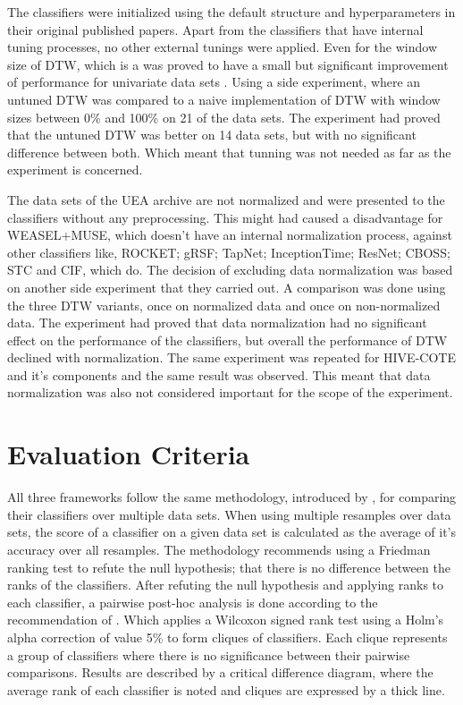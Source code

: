The classifiers were initialized using the default structure and hyperparameters in their original published papers.
Apart from the classifiers that have internal tuning processes, no other external tunings were applied.
Even for the window size of DTW, which is a was proved to have a small but significant improvement of performance for univariate data sets \cite{ratanamahatana2005three}.
Using a side experiment, where an untuned DTW was compared to a naive implementation of DTW with window sizes between 0\% and 100\% on 21 of the data sets.
The experiment had proved that the untuned DTW was better on 14 data sets, but with no significant difference between both.
Which meant that tunning was not needed as far as the experiment is concerned.

The data sets of the UEA archive are not normalized and were presented to the classifiers without any preprocessing.
This might had caused a disadvantage for WEASEL+MUSE, which doesn't have an internal normalization process, against other classifiers like,
ROCKET; gRSF; TapNet; InceptionTime; ResNet; CBOSS; STC and CIF, which do.
The decision of excluding data normalization was based on another side experiment that they carried out.
A comparison was done using the three DTW variants, once on normalized data and once on non-normalized data.
The experiment had proved that data normalization had no significant effect on the performance of the classifiers, but overall the performance of DTW declined with normalization.
The same experiment was repeated for HIVE-COTE and it's components and the same result was observed.
This meant that data normalization was also not considered important for the scope of the experiment.

\section{Evaluation Criteria}
\label{ReviewsEvaluation}
All three frameworks follow the same methodology, introduced by \cite{demvsar2006statistical}, for comparing their classifiers over multiple data sets.
When using multiple resamples over data sets, the score of a classifier on a given data set is calculated as the average of it's accuracy over all resamples.
The methodology recommends using a Friedman ranking test to refute the null hypothesis; that there is no difference between the ranks of the classifiers.
After refuting the null hypothesis and applying ranks to each classifier, a pairwise post-hoc analysis is done according to the recommendation of \cite{benavoli2016should}.
Which applies a Wilcoxon signed rank test using a Holm's alpha correction of value 5\% to form cliques of classifiers.
Each clique represents a group of classifiers where there is no significance between their pairwise comparisons.
Results are described by a critical difference diagram, where the average rank of each classifier is noted and cliques are expressed by a thick line.